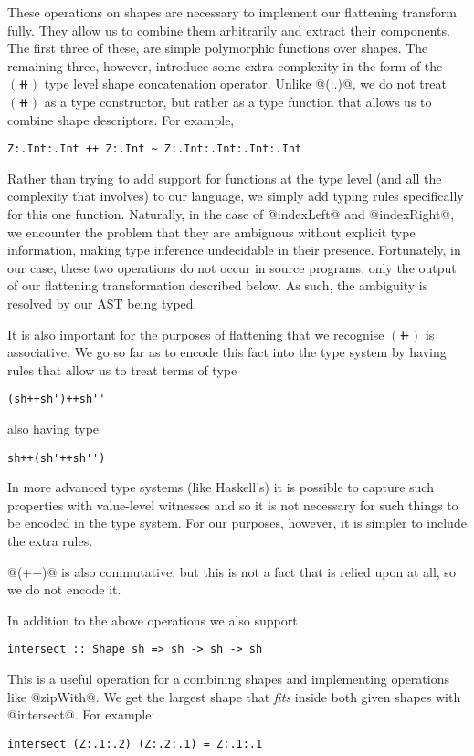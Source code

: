 These operations on shapes are necessary to implement our flattening transform fully. They allow us to combine them arbitrarily and extract their components. The first three of these, are simple polymorphic functions over shapes. The remaining three, however, introduce some extra complexity in the form of the $(\doubleplus)$ type level shape concatenation operator. Unlike @(:.)@, we do not treat $(\doubleplus)$ as a type constructor, but rather as a type function that allows us to combine shape descriptors. For example,
%
\begin{lstlisting}[style=ndp]
Z:.Int:.Int ++ Z:.Int ~ Z:.Int:.Int:.Int:.Int
\end{lstlisting}

Rather than trying to add support for functions at the type level (and all the complexity that involves) to our language, we simply add typing rules specifically for this one function. Naturally, in the case of @indexLeft@ and @indexRight@, we encounter the problem that they are ambiguous without explicit type information, making type inference undecidable in their presence. Fortunately, in our case, these two operations do not occur in source programs, only the output of our flattening transformation described below. As such, the ambiguity is resolved by our AST being typed.

It is also important for the purposes of flattening that we recognise $(\doubleplus)$ is associative. We go so far as to encode this fact into the type system by having rules that allow us to treat terms of type
%
\begin{lstlisting}[style=ndp]
(sh++sh')++sh''
\end{lstlisting}
%
also having type
%
\begin{lstlisting}[style=ndp]
sh++(sh'++sh'')
\end{lstlisting}

In more advanced type systems (like Haskell's) it is possible to capture such properties with value-level witnesses and so it is not necessary for such things to be encoded in the type system. For our purposes, however, it is simpler to include the extra rules.

@(++)@ is also commutative, but this is not a fact that is relied upon at all, so we do not encode it.

In addition to the above operations we also support
%
\begin{lstlisting}
intersect :: Shape sh => sh -> sh -> sh
\end{lstlisting}
%
This is a useful operation for a combining shapes and implementing operations like @zipWith@. We get the largest shape that \emph{fits} inside both given shapes with @intersect@. For example:
%
\begin{lstlisting}
intersect (Z:.1:.2) (Z:.2:.1) = Z:.1:.1
\end{lstlisting}

